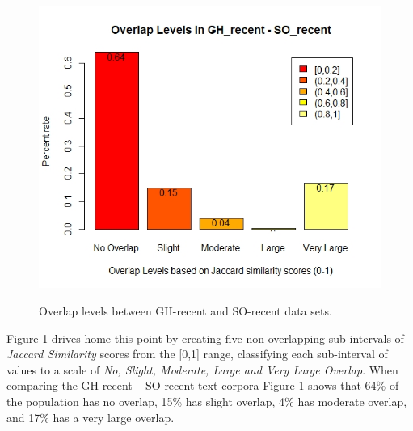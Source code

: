         \begin{figure}
          \centering
          \includegraphics[width=\textwidth]{figures/overlap_GH_SO_recent.jpeg}\\
          \caption{Overlap levels between GH-recent and SO-recent data sets.}
          \label{fig:overlap_GH_SO_recent}
        \end{figure}
        
        Figure \ref{fig:overlap_GH_SO_recent} drives home this point by creating five non-overlapping sub-intervals of \emph{Jaccard Similarity} scores from the [0,1] range, classifying each sub-interval of values to a scale of \emph{No, Slight, Moderate, Large and Very Large Overlap}. When comparing the GH-recent -- SO-recent text corpora Figure \ref{fig:overlap_GH_SO_recent} shows that 64\% of the population has no overlap, 15\% has slight overlap, 4\% has moderate overlap, and 17\% has a very large overlap. 
        

